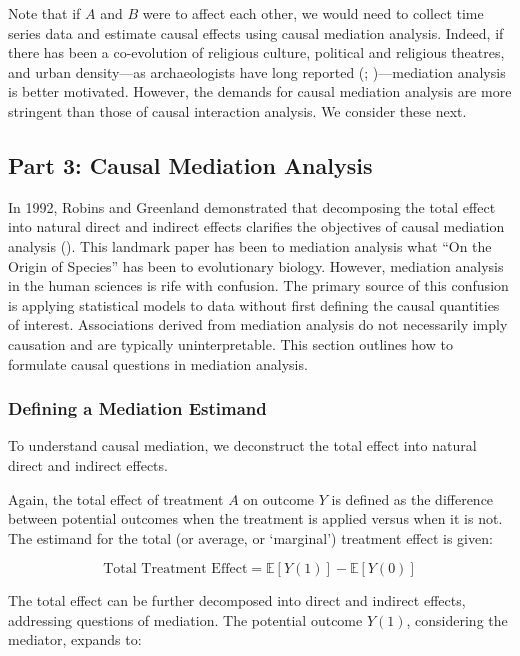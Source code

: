 \documentclass[
  single column]{article}
\begin{document}
Note that if \(A\) and \(B\) were to affect each other, we would need to
collect time series data and estimate causal effects using causal
mediation analysis. Indeed, if there has been a co-evolution of
religious culture, political and religious theatres, and urban
density---as archaeologists have long reported
(;
)---mediation analysis is
better motivated. However, the demands for causal mediation analysis are
more stringent than those of causal interaction analysis. We consider
these next.

\subsection{Part 3: Causal Mediation Analysis}\label{id-sec-3}

In 1992, Robins and Greenland demonstrated that decomposing the total
effect into natural direct and indirect effects clarifies the objectives
of causal mediation analysis (). This landmark paper has been to mediation analysis
what ``On the Origin of Species'' has been to evolutionary biology.
However, mediation analysis in the human sciences is rife with
confusion. The primary source of this confusion is applying statistical
models to data without first defining the causal quantities of interest.
Associations derived from mediation analysis do not necessarily imply
causation and are typically uninterpretable. This section outlines how
to formulate causal questions in mediation analysis.

\subsubsection{Defining a Mediation
Estimand}\label{defining-a-mediation-estimand}

To understand causal mediation, we deconstruct the total effect into
natural direct and indirect effects.

Again, the total effect of treatment \(A\) on outcome \(Y\) is defined
as the difference between potential outcomes when the treatment is
applied versus when it is not. The estimand for the total (or average,
or `marginal') treatment effect is given:

\[
\text{Total Treatment Effect} = \mathbb{E}[Y(1)] - \mathbb{E}[Y(0)]
\]

The total effect can be further decomposed into direct and indirect
effects, addressing questions of mediation. The potential outcome
\(Y(1)\), considering the mediator, expands to:
\end{document}
